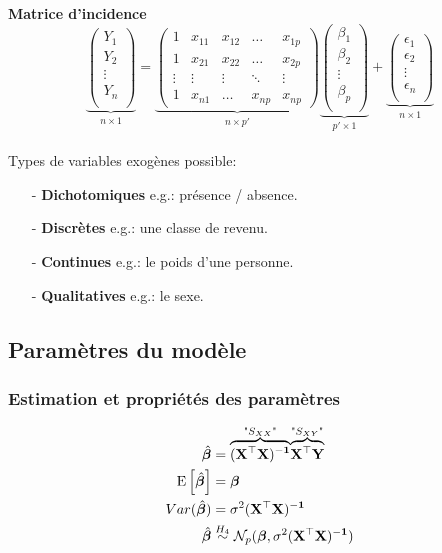 \documentclass[10pt, french]{article}
\begin{document}
\begin{multicols*}{3}
\textbf{Matrice d'incidence}\\
\[
\underset{n\times 1}{\underbrace{\begin{pmatrix}
Y_1\\ 
Y_2\\ 
\vdots\\ 
Y_n\\ 
\end{pmatrix}
}}
=
\underset{n\times p'}{\underbrace{\begin{pmatrix}
1 & x_{11} & x_{12} & \dots & x_{1p} \\ 
1 & x_{21} & x_{22} & \dots  & x_{2p} \\ 
\vdots & \vdots & \vdots  & \ddots & \vdots \\ 
1 & x_{n1}  & \dots & x_{np} & x_{np}
\end{pmatrix}}}
\underset{p'\times 1}{\underbrace{\begin{pmatrix}
\beta_1\\ 
\beta_2\\ 
\vdots\\ 
\beta_p\\ 
\end{pmatrix}}}
+
\underset{n\times 1}{\underbrace{\begin{pmatrix}
\epsilon_1\\ 
\epsilon_2\\ 
\vdots\\ 
\epsilon_n\\ 
\end{pmatrix}}}
\]
\\
Types de variables exogènes possible:
\begin{enumerate}
	\item[ - ] \textbf{Dichotomiques} e.g.: présence / absence.
	\item[ - ] \textbf{Discrètes} e.g.: une classe de revenu.
	\item[ - ] \textbf{Continues} e.g.: le poids d'une personne.
	\item[ - ] \textbf{Qualitatives}	e.g.: le sexe.
\end{enumerate}



\subsection*{Paramètres du modèle}
\subsubsection*{Estimation et propriétés des paramètres}
\begin{align*}
\hat{\bm{\beta}} &= \overset{\text{"}S_{XX}\text{"}}{\overbrace{(\mathbf{X^\top X)^{-1}}}} \overset{\text{"}S_{XY}\text{"}}{\overbrace{\mathbf{X^\top Y}}} \\
\mathrm{E} \left[ \hat{\bm{\beta}} \right]	&= \bm{\beta} \quad \\ Var(\hat{\bm{\beta}}) &= \sigma^2 (\mathbf{X^\top X)^{-1}} \\
\hat{\bm{\beta}} &\overset{H_4}{\sim} \mathcal{N}_p(\bm{\beta}, \sigma^2 (\mathbf{X^\top X)^{-1}})
\end{align*}


\end{multicols*}
\end{document}
